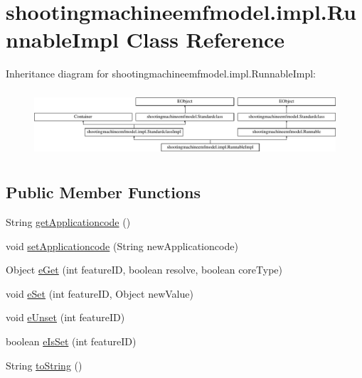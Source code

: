 \hypertarget{classshootingmachineemfmodel_1_1impl_1_1_runnable_impl}{\section{shootingmachineemfmodel.\-impl.\-Runnable\-Impl Class Reference}
\label{classshootingmachineemfmodel_1_1impl_1_1_runnable_impl}
}
Inheritance diagram for shootingmachineemfmodel.\-impl.\-Runnable\-Impl\-:\begin{figure}[H]
\begin{center}
\leavevmode
\includegraphics[height=2.497213cm]{classshootingmachineemfmodel_1_1impl_1_1_runnable_impl}
\end{center}
\end{figure}
\subsection*{Public Member Functions}
\begin{DoxyCompactItemize}
\item 
String \hyperlink{classshootingmachineemfmodel_1_1impl_1_1_runnable_impl_a0c4ca1026ad6477d734cdb3ddcaee3c0}{get\-Applicationcode} ()
\item 
void \hyperlink{classshootingmachineemfmodel_1_1impl_1_1_runnable_impl_a124c6368516befc6d936829f8404d95f}{set\-Applicationcode} (String new\-Applicationcode)
\item 
Object \hyperlink{classshootingmachineemfmodel_1_1impl_1_1_runnable_impl_a4c9d420ff5f32e550a02841970ecc155}{e\-Get} (int feature\-I\-D, boolean resolve, boolean core\-Type)
\item 
void \hyperlink{classshootingmachineemfmodel_1_1impl_1_1_runnable_impl_a22d75976ee937f525a1eb564706f8f34}{e\-Set} (int feature\-I\-D, Object new\-Value)
\item 
void \hyperlink{classshootingmachineemfmodel_1_1impl_1_1_runnable_impl_aa5da6eba166ffb219700e4a553d06d29}{e\-Unset} (int feature\-I\-D)
\item 
boolean \hyperlink{classshootingmachineemfmodel_1_1impl_1_1_runnable_impl_a79ba5ffd227102247a7fd8418e6845f6}{e\-Is\-Set} (int feature\-I\-D)
\item 
String \hyperlink{classshootingmachineemfmodel_1_1impl_1_1_runnable_impl_abbb4e736a9d5bf68d2884cec077b0842}{to\-String} ()
\end{DoxyCompactItemize}
